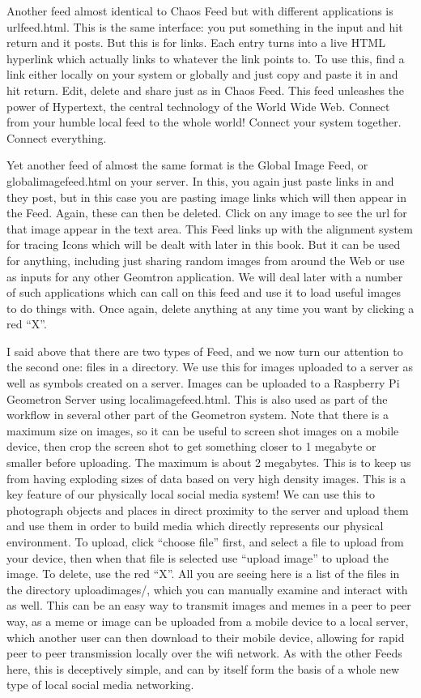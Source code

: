 Another feed almost identical to Chaos Feed but with different applications is urlfeed.html.  This is the same interface: you put something in the input and hit return and it posts.  But this is for links. Each entry turns into a live HTML hyperlink which actually links to whatever the link points to.  To use this, find a link either locally on your system or globally and just copy and paste it in and hit return.  Edit, delete and share just as in Chaos Feed.  This feed unleashes the power of Hypertext, the central technology of the World Wide Web.  Connect from your humble local feed to the whole world! Connect your system together. Connect everything.

Yet another feed of almost the same format is the Global Image Feed, or globalimagefeed.html on your server.  In this, you again just paste links in and they post, but in this case you are pasting image links which will then appear in the Feed. Again, these can then be deleted.  Click on any image to see the url for that image appear in the text area.  This Feed links up with the alignment system for tracing Icons which will be dealt with later in this book.  But it can be used for anything, including just sharing random images from around the Web or use as inputs for any other Geomtron application.  We will deal later with a number of such applications which can call on this feed and use it to load useful images to do things with.  Once again, delete anything at any time you want by clicking a red ``X''.

I said above that there are two types of Feed, and we now turn our attention to the second one: files in a directory.  We use this for images uploaded to a server as well as symbols created on a server.  Images can be uploaded to a Raspberry Pi Geometron Server using localimagefeed.html.  This is also used as part of the workflow in several other part of the Geometron system.  Note that there is a maximum size on images, so it can be useful to screen shot images on a mobile device, then crop the screen shot to get something closer to 1 megabyte or smaller before uploading.  The maximum is about 2 megabytes.  This is to keep us from having exploding sizes of data based on very high density images.  This is a key feature of our physically local social media system!  We can use this to photograph objects and places in direct proximity to the server and upload them and use them in order to build media which directly represents our physical environment.  To upload, click ``choose file'' first, and select a file to upload from your device, then when that file is selected use ``upload image'' to upload the image.  To delete, use the red ``X''.  All you are seeing here is a list of the files in the directory uploadimages/, which you can manually examine and interact with as well.  This can be an easy way to transmit images and memes in a peer to peer way, as a meme or image can be uploaded from a mobile device to a local server, which another user can then download to their mobile device, allowing for rapid peer to peer transmission locally over the wifi network.  As with the other Feeds here, this is deceptively simple, and can by itself form the basis of a whole new type of local social media networking.

